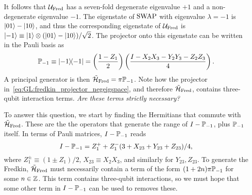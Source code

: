 It follows that ${\mathcal{U}}_{\operatorname{Fred}}$ has a seven-fold degenerate eigenvalue $+1$ and a non-degenerate eigenvalue $-1$.
The eigenstate of $\operatorname{SWAP}$ with eigenvalue $\lambda=-1$ is $\ket{01}-\ket{10}$, and thus the corresponding eigenstate of ${\mathcal{U}}_{\operatorname{Fred}}$ is $\ket{-1}\equiv\ket1\otimes(\ket{01}-\ket{10})/\sqrt2$.
The projector onto this eigenstate can be written in the Pauli basis as
\begin{equation}
    {\mathbb{P}}_{-1}\equiv \ketbra{-1} =
    \left(\frac{1-Z_1}{2}\right)
    \left(\frac{I - X_2 X_3 - Y_2 Y_3 - Z_2 Z_3}{4}\right).
    \label{eq:GL:fredkin_projector_negeigspace}
\end{equation}
A principal generator is then $\tilde{{\mathcal{H}}}_{\operatorname{Fred}} = \pi{\mathbb{P}}_{-1}$.
Note how the projector in~\cref{eq:GL:fredkin_projector_negeigspace}, and therefore $\tilde{{\mathcal{H}}}_{\operatorname{Fred}}$, contains three-qubit interaction terms.
\emph{Are these terms strictly necessary?}

To answer this question, we start by finding the Hermitians that commute with $\tilde{{\mathcal{H}}}_{\operatorname{Fred}}$.
These are the the operators that generate the range of $I-{\mathbb{P}}_{-1}$, plus ${\mathbb{P}}_{-1}$ itself.
In terms of Pauli matrices, $I-{\mathbb{P}}_{-1}$ reads
\begin{equation}
    I - {\mathbb{P}}_{-1} = Z_1^+ + Z_1^- (3 + X_{23} + Y_{23} + Z_{23})/4,
\end{equation}
where $Z_1^\pm\equiv(1\pm Z_1)/2$, $X_{23}\equiv X_2X_3$, and similarly for $Y_{23},Z_{23}$.
To generate the Fredkin, $\tilde{{\mathcal{H}}}_{\operatorname{Fred}}$ must necessarily contain a term of the form
$(1 + 2n)\pi {\mathbb{P}}_{-1}$ for some $n\in{\mathbb{Z}}$.
This term contains three-qubit interactions, so we must hope that some other term in $I-{\mathbb{P}}_{-1}$ can be used to removes these.


